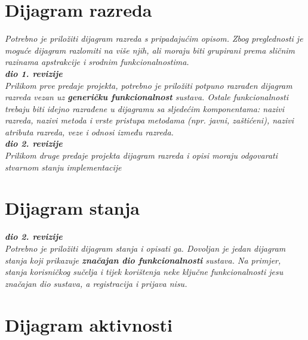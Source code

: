 \begin{itemize}
\begin{figure}
			    \label{fig:enter-label}
			\end{figure}
			\eject
			
			
		\section{Dijagram razreda}
		
			\textit{Potrebno je priložiti dijagram razreda s pripadajućim opisom. Zbog preglednosti je moguće dijagram razlomiti na više njih, ali moraju biti grupirani prema sličnim razinama apstrakcije i srodnim funkcionalnostima.}\\
			
			\textbf{\textit{dio 1. revizije}}\\
			
			\textit{Prilikom prve predaje projekta, potrebno je priložiti potpuno razrađen dijagram razreda vezan uz \textbf{generičku funkcionalnost} sustava. Ostale funkcionalnosti trebaju biti idejno razrađene u dijagramu sa sljedećim komponentama: nazivi razreda, nazivi metoda i vrste pristupa metodama (npr. javni, zaštićeni), nazivi atributa razreda, veze i odnosi između razreda.}\\
			
			\textbf{\textit{dio 2. revizije}}\\			
			
			\textit{Prilikom druge predaje projekta dijagram razreda i opisi moraju odgovarati stvarnom stanju implementacije}
			
			
			
			\eject
		
		\section{Dijagram stanja}
			
			
			\textbf{\textit{dio 2. revizije}}\\
			
			\textit{Potrebno je priložiti dijagram stanja i opisati ga. Dovoljan je jedan dijagram stanja koji prikazuje \textbf{značajan dio funkcionalnosti} sustava. Na primjer, stanja korisničkog sučelja i tijek korištenja neke ključne funkcionalnosti jesu značajan dio sustava, a registracija i prijava nisu. }
			
			
			\eject 
		
		\section{Dijagram aktivnosti}
			

\end{itemize}
